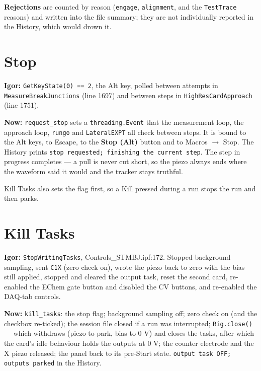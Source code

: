 \textbf{Rejections} are counted by reason (\texttt{engage}, \texttt{alignment}, and the \texttt{Test\discretionary{}{}{}Trace} reasons) and written into the file summary; they are not individually reported in the History, which would drown it.

\section{Stop}

\textbf{Igor:} \texttt{Get\discretionary{}{}{}Key\discretionary{}{}{}State(0) == 2}, the Alt key, polled between attempts in \texttt{Measure\discretionary{}{}{}Break\discretionary{}{}{}Junctions} (line 1697) and between steps in \texttt{High\discretionary{}{}{}Res\discretionary{}{}{}Card\discretionary{}{}{}Approach} (line 1751).

\textbf{Now:} \texttt{request\_\discretionary{}{}{}stop} sets a \texttt{threading.\discretionary{}{}{}Event} that the measurement loop, the approach loop, \texttt{rungo} and \texttt{Lateral\discretionary{}{}{}EXPT} all check between steps. It is bound to the Alt keys, to Escape, to the \textbf{Stop (Alt)} button and to Macros $\rightarrow$ Stop. The History prints \texttt{stop requested; finishing the current step}. The step in progress completes --- a pull is never cut short, so the piezo always ends where the waveform said it would and the tracker stays truthful.

Kill Tasks also sets the flag first, so a Kill pressed during a run stops the run and then parks.

\section{Kill Tasks}

\textbf{Igor:} \texttt{Stop\discretionary{}{}{}Writing\discretionary{}{}{}Tasks}, Controls\_STMBJ.ipf:172. Stopped background sampling, sent \texttt{C1X} (zero check on), wrote the piezo back to zero with the bias still applied, stopped and cleared the output task, reset the second card, re-enabled the EChem gate button and disabled the CV buttons, and re-enabled the DAQ-tab controls.

\textbf{Now:} \texttt{kill\_\discretionary{}{}{}tasks}: the stop flag; background sampling off; zero check on (and the checkbox re-ticked); the session file closed if a run was interrupted; \texttt{Rig.\discretionary{}{}{}close()} --- which withdraws (piezo to park, bias to 0 V) and closes the tasks, after which the card's idle behaviour holds the outputs at 0 V; the counter electrode and the X piezo released; the panel back to its pre-Start state. \texttt{output task OFF; outputs parked} in the History.

